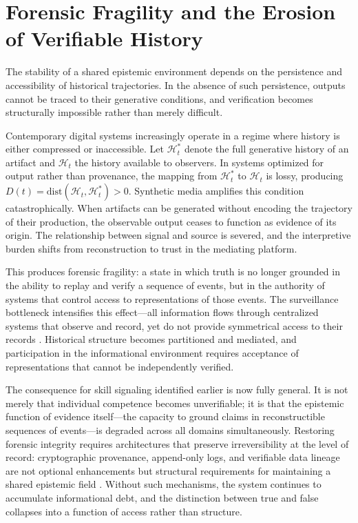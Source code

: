 \documentclass[12pt, a4paper]{article}
\begin{document}
\section{Forensic Fragility and the Erosion of Verifiable History}

The stability of a shared epistemic environment depends on the persistence and accessibility of historical trajectories. In the absence of such persistence, outputs cannot be traced to their generative conditions, and verification becomes structurally impossible rather than merely difficult.

Contemporary digital systems increasingly operate in a regime where history is either compressed or inaccessible. Let $\mathcal{H}_t^*$ denote the full generative history of an artifact and $\mathcal{H}_t$ the history available to observers. In systems optimized for output rather than provenance, the mapping from $\mathcal{H}_t^*$ to $\mathcal{H}_t$ is lossy, producing $D(t) = \mathrm{dist}(\mathcal{H}_t, \mathcal{H}_t^*) > 0$. Synthetic media amplifies this condition catastrophically. When artifacts can be generated without encoding the trajectory of their production, the observable output ceases to function as evidence of its origin. The relationship between signal and source is severed, and the interpretive burden shifts from reconstruction to trust in the mediating platform.

This produces forensic fragility: a state in which truth is no longer grounded in the ability to replay and verify a sequence of events, but in the authority of systems that control access to representations of those events. The surveillance bottleneck intensifies this effect---all information flows through centralized systems that observe and record, yet do not provide symmetrical access to their records \cite{Zuboff2019}. Historical structure becomes partitioned and mediated, and participation in the informational environment requires acceptance of representations that cannot be independently verified.

The consequence for skill signaling identified earlier is now fully general. It is not merely that individual competence becomes unverifiable; it is that the epistemic function of evidence itself---the capacity to ground claims in reconstructible sequences of events---is degraded across all domains simultaneously. Restoring forensic integrity requires architectures that preserve irreversibility at the level of record: cryptographic provenance, append-only logs, and verifiable data lineage are not optional enhancements but structural requirements for maintaining a shared epistemic field \cite{Landauer1961}. Without such mechanisms, the system continues to accumulate informational debt, and the distinction between true and false collapses into a function of access rather than structure.
\end{document}
